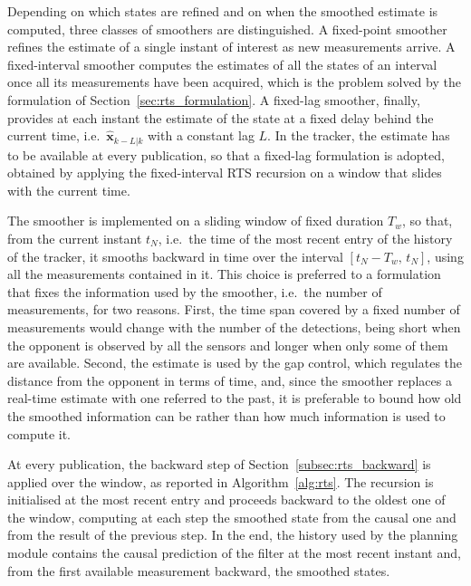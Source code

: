 Depending on which states are refined and on when the smoothed estimate is computed, three
classes of smoothers are distinguished. A fixed-point smoother refines the estimate of a
single instant of interest as new measurements arrive. A fixed-interval smoother computes
the estimates of all the states of an interval once all its measurements have been acquired,
which is the problem solved by the formulation of Section~\ref{sec:rts_formulation}. A
fixed-lag smoother, finally, provides at each instant the estimate of the state at a fixed
delay behind the current time, i.e.\ $\hat{\mathbf{x}}_{k-L|k}$ with a constant lag $L$. In
the tracker, the estimate has to be
available at every publication, so that a fixed-lag formulation is adopted, obtained by
applying the fixed-interval RTS recursion on a window that slides with the current time.

The smoother is implemented on a sliding window of fixed duration $T_w$, so that, from the
current instant $t_N$, i.e.\ the time of the most recent entry of the history of the tracker,
it smooths backward in time over the interval $[t_N - T_w,\, t_N]$, using all the measurements
contained in it. This choice is preferred to a formulation that fixes the information used by
the smoother, i.e.\ the number of measurements, for two reasons. First, the time span covered
by a fixed number of measurements would change with the number of the detections,
being short when the opponent is observed by all the sensors and longer when only some of them
are available. Second, the estimate is used by the gap control, which regulates the distance
from the opponent in terms of time, and, since the smoother replaces a real-time estimate with
one referred to the past, it is preferable to bound how old the smoothed information can be
rather than how much information is used to compute it.

At every publication, the backward step of Section~\ref{subsec:rts_backward} is applied over
the window, as reported in Algorithm~\ref{alg:rts}. The recursion is initialised at the most recent entry and proceeds backward to the oldest one
of the window, computing at each step the smoothed state from the causal one and from the
result of the previous step. In the end, the history used by the planning module contains the causal
prediction of the filter at the most recent instant and, from the first available measurement
backward, the smoothed states.

